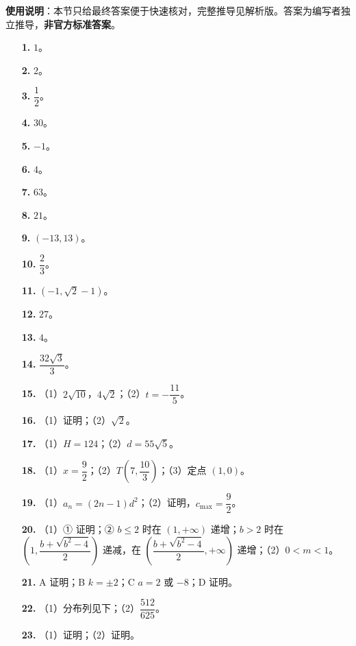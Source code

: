 
\begin{gknotice}
\textbf{使用说明}：本节只给最终答案便于快速核对，完整推导见解析版。答案为编写者独立推导，\textbf{非官方标准答案}。
\end{gknotice}

\begin{itemize}[leftmargin=2.6em]
  \item[\textbf{1.}] $1$。
  \item[\textbf{2.}] $2$。
  \item[\textbf{3.}] $\dfrac12$。
  \item[\textbf{4.}] $30$。
  \item[\textbf{5.}] $-1$。
  \item[\textbf{6.}] $4$。
  \item[\textbf{7.}] $63$。
  \item[\textbf{8.}] $21$。
  \item[\textbf{9.}] $(-13,13)$。
  \item[\textbf{10.}] $\dfrac23$。
  \item[\textbf{11.}] $(-1,\sqrt2-1)$。
  \item[\textbf{12.}] $27$。
  \item[\textbf{13.}] $4$。
  \item[\textbf{14.}] $\dfrac{32\sqrt3}{3}$。
\end{itemize}

\begin{itemize}[leftmargin=2.6em]
  \item[\textbf{15.}] （1）$2\sqrt{10}$，$4\sqrt2$；（2）$t=-\dfrac{11}5$。
  \item[\textbf{16.}] （1）证明；（2）$\sqrt2$。
  \item[\textbf{17.}] （1）$H=124$；（2）$d=55\sqrt5$。
  \item[\textbf{18.}] （1）$x=\dfrac92$；（2）$T\left(7,\dfrac{10}3\right)$；（3）定点 $(1,0)$。
  \item[\textbf{19.}] （1）$a_n=(2n-1)d^2$；（2）证明，$c_{\max}=\dfrac92$。
  \item[\textbf{20.}] （1）① 证明；② $b\leqslant2$ 时在 $(1,+\infty)$ 递增；$b>2$ 时在 $\left(1,\dfrac{b+\sqrt{b^2-4}}2\right)$ 递减，在 $\left(\dfrac{b+\sqrt{b^2-4}}2,+\infty\right)$ 递增；（2）$0<m<1$。
\end{itemize}

\begin{itemize}[leftmargin=2.6em]
  \item[\textbf{21.}] A 证明；B $k=\pm2$；C $a=2$ 或 $-8$；D 证明。
  \item[\textbf{22.}] （1）分布列见下；（2）$\dfrac{512}{625}$。
  \item[\textbf{23.}] （1）证明；（2）证明。
\end{itemize}
